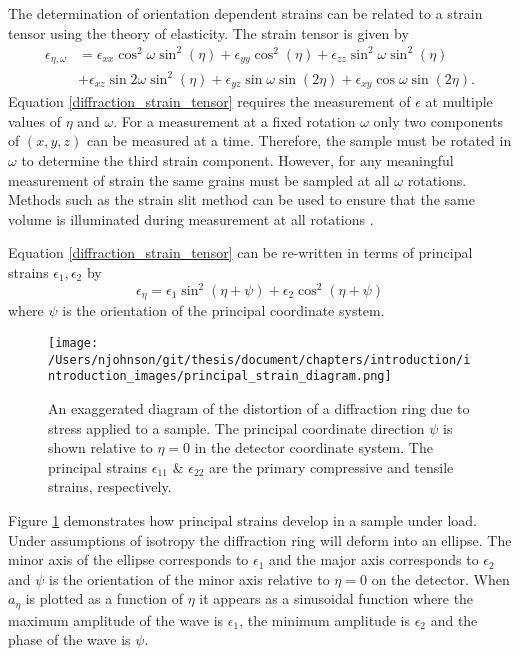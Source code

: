 The determination of orientation dependent strains can be related to a strain tensor using the theory of elasticity. The strain tensor is given by
\begin{equation}
	\begin{split}
	\epsilon_{\eta,\omega} &  = \epsilon_{xx}\cos^2\omega\sin^2(\eta) + \epsilon_{yy}\cos^2(\eta) + \epsilon_{zz}\sin^2\omega\sin^2(\eta) \\
	& + \epsilon_{xz}\sin2\omega\sin^2(\eta) + \epsilon_{yz}\sin\omega\sin(2\eta) + \epsilon_{xy}\cos\omega\sin(2\eta).
	\label{diffraction_strain_tensor}
	\end{split}
\end{equation}
Equation \ref{diffraction_strain_tensor} requires the measurement of $\epsilon$ at multiple values of $\eta$ and $\omega$. For a measurement at a fixed rotation $\omega$ only two components of $(x,y,z)$ can be measured at a time. Therefore, the sample must be rotated in $\omega$ to determine the third strain component. However, for any meaningful measurement of strain the same grains must be sampled at all $\omega$ rotations. Methods such as the strain slit method can be used to ensure that the same volume is illuminated during measurement at all rotations \cite{Strantza2018}.

Equation \ref{diffraction_strain_tensor} can be re-written in terms of principal strains $\epsilon_1, \epsilon_2$ by
\begin{equation}
	\epsilon_{\eta} = \epsilon_1 \sin^2(\eta + \psi) + \epsilon_2\cos^2(\eta + \psi)
	\label{diffraction_principal_strains}
\end{equation}
where $\psi$ is the orientation of the principal coordinate system.

\begin{figure}
	\texttt{[image: /Users/njohnson/git/thesis/document/chapters/introduction/introduction\_images/principal\_strain\_diagram.png]}
	\caption{An exaggerated diagram of the distortion of a diffraction ring due to stress applied to a sample. The principal coordinate direction $\psi$ is shown relative to $\eta = 0$ in the detector coordinate system. The principal strains $\epsilon_{11}$ \& $\epsilon_{22}$ are the primary compressive and tensile strains, respectively.}
	\label{principal_strain_diagram}
\end{figure}

Figure \ref{principal_strain_diagram} demonstrates how principal strains develop in a sample under load. Under assumptions of isotropy the diffraction ring will deform into an ellipse. The minor axis of the ellipse corresponds to $\epsilon_1$ and the major axis corresponds to $\epsilon_2$ and $\psi$ is the orientation of the minor axis relative to $\eta =0$ on the detector. When $a_{\eta}$ is plotted as a function of $\eta$ it appears as a sinusoidal function where the maximum amplitude of the wave is $\epsilon_1$, the minimum amplitude is $\epsilon_2$ and the phase of the wave is $\psi$. 

